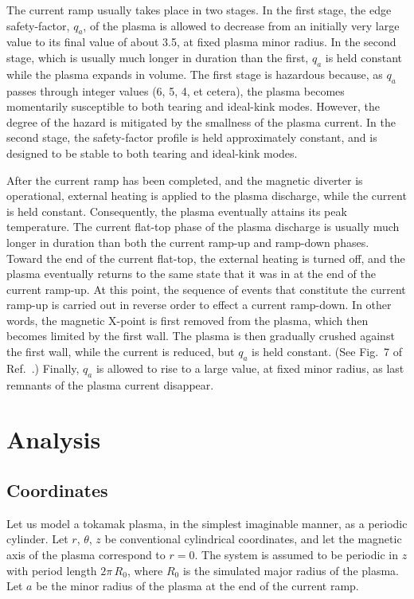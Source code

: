 \documentclass[12pt,prb,aps]{revtex4-1}
\begin{document}
The current ramp usually takes place in two stages. In the first stage, the edge safety-factor, $q_a$, of the  plasma is allowed to decrease from
an initially very large value to its final value of about 3.5, at fixed plasma minor radius. In the second stage, which is usually much longer in duration than the first, $q_a$ is held constant
while the plasma expands in volume. The first stage is hazardous because, as $q_a$ passes through integer values (6, 5, 4, et cetera), the plasma becomes
momentarily susceptible  to both tearing and ideal-kink modes.\cite{wesson,cheng} However, the degree of the hazard is mitigated by the smallness of the plasma current.
In the second stage, the safety-factor profile is  held approximately constant, and is designed to be stable to both tearing and ideal-kink modes. 

After the current ramp has been completed, and the magnetic diverter is operational,  external heating is applied to the plasma discharge, while the  current is held constant.
Consequently, 
the plasma eventually attains its peak temperature. The current flat-top phase of the plasma discharge is usually much longer in duration than both the current ramp-up and ramp-down
phases. Toward the end of the current flat-top, the external heating is turned off, and the plasma eventually returns to the same state that it was in at the end of the
current ramp-up. At this point, the sequence of events that constitute the current ramp-up is carried out in reverse order to effect a current ramp-down. In other words, the magnetic X-point
is first removed from the plasma, which  then becomes limited by the first wall. The plasma is then gradually crushed against the first wall, while the current is reduced, but
$q_a$ is held constant. (See Fig.~7 of Ref.~.) Finally, $q_a$ is allowed to rise to a large value, at fixed minor radius,  as last remnants of the plasma current disappear. 

\section{Analysis}
\subsection{Coordinates}
Let us model a tokamak plasma, in the simplest imaginable manner, as a periodic cylinder. Let $r$, $\theta$, $z$ be conventional cylindrical coordinates, and
let the magnetic axis of the plasma correspond to $r=0$. The system is assumed to be periodic in $z$ with period length $2\pi\,R_0$, where $R_0$ is the
simulated major radius of the plasma. Let $a$ be the minor radius of the plasma at the end of the current ramp. 
\end{document}
